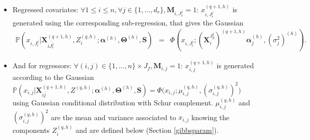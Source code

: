 \documentclass[12pt,a4paper]{report}
\begin{document}
		\begin{itemize}
			\item Regressed covariates: $\forall 1\leq i \leq n, \forall j \in \{1,\dots,d_r \}, \boldsymbol{M}_{i,J_r^j}=1  $:  $x_{i,J_r^j}^{(q+1,h)}$ is generated using the corresponding sub-regression, that gives the Gaussian
			\begin{eqnarray}
			\mathbb{P}(x_{i,J_r^j}|\boldsymbol{X}^{(q+1,h)}_{\bar{iJ_r^j}},Z_i^{(q,h)};\boldsymbol{\alpha}^{(h)},\boldsymbol{\Theta}^{(h)},\boldsymbol{S})%
			&=&\Phi(x_{i,J_r^j};(\boldsymbol{X}_i^{J_p^j})^{(q+1,h)}\boldsymbol{\alpha}^{(h)}_{j},(\sigma_j^2)^{(h)} ). \nonumber
			\end{eqnarray}		
			\item And for regressors:
			$\forall (i,j) \in \{1,\dots,n \}\times J_f,\boldsymbol{M}_{i,j}=1$:  $x_{i,j}^{(q+1,h)}$ is generated according to the Gaussian $\mathbb{P}(x_{i,j}|\boldsymbol{X}_{i\bar{j}}^{(q+1,h)},Z^{(q,h)};\boldsymbol{\alpha}^{(h)},\boldsymbol{\Theta}^{(h)},\boldsymbol{S})=\Phi \big(x_{i,j}; \mu_{i,j}^{(q,h)}, (\sigma_{i,j}^{(q,h)})^2\big)$ using Gaussian conditional distribution with Schur complement. $\mu_{i,j}^{(q,h)}$ and $(\sigma_{i,j}^{(q,h)})^2$  are the mean and variance associated to $x_{i,j}$ knowing the components $Z_i^{(q,h)}$ and are defined below (Section \ref{gibbsparam}).
		\end{itemize}		
			
\end{document}
